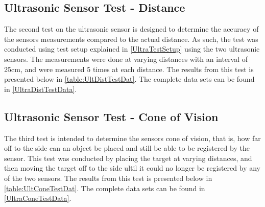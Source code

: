 \subsection{Ultrasonic Sensor Test - Distance}
The second test on the ultrasonic sensor is designed to determine the accuracy
of the sensors measurements compared to the actual distance. As such, the test
was conducted using test setup explained in \autoref{UltraTestSetup} using the
two ultrasonic sensors. The measurements were done at varying distances with an
interval of 25cm, and were measured 5 times at each distance. The results from
this test is presented below in \autoref{table:UltDistTestDat}. The complete
data sets can be found in \autoref{UltraDistTestData}.



\subsection{Ultrasonic Sensor Test - Cone of Vision}
The third test is intended to determine the sensors cone of vision, that is, how
far off to the side can an object be placed and still be able to be registered
by the sensor. This test was conducted by placing the target at varying
distances, and then moving the target off to the side ultil it could no longer
be registered by any of the two sensors. The results from
this test is presented below in \autoref{table:UltConeTestDat}. The complete
data sets can be found in \autoref{UltraConeTestData}.





